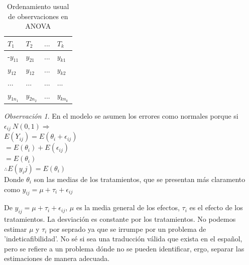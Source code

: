 \documentclass[11pt,a4paper,oneside]{report}
\theoremstyle{definition}
\theoremstyle{plain}
\theoremstyle{remark}
\newtheorem*{observacion}{Observación}
\begin{document}
\begin{table}[H]
  \centering
  \caption{Ordenamiento usual de observaciones en ANOVA}
  \begin{tabular}{@{}l >{\centering\arraybackslash}p{2.2cm}
                    >{\centering\arraybackslash}p{2.2cm}
                    >{\centering\arraybackslash}p{2.2cm}@{}}
    \toprule
    $T_1$ & $T_2$ & $...$ & $T_k$ \\
    \midrule
   -$y_{11}$ & $y_{21}$ &  $...$ & $y_{k1}$\\
    $y_{12}$ & $y_{12}$ &  $...$ & $y_{k2}$\\
    $...$ &  $...$ &  $...$ & $...$ \\
    $y_{1n_1}$ & $y_{2n_2}$ & $...$ & $y_{kn_k}$ \\
    \bottomrule
  \end{tabular}
\end{table}

\begin{observacion}
  En el modelo se asumen los errores como normales porque si $\epsilon_{ij}~N(0,1) \Rightarrow$\\
  $E(Y_{ij})=E(\theta_i + \epsilon_{ij})$\\
  $=E(\theta_i)+E(\epsilon_{ij})$\\
  $=E(\theta_i)$\\
  $\therefore E(y_ij)=E(\theta_i)$\\
  Donde $\theta_i$ son las medias de los tratamientos, que se presentan más claramento como $y_{ij}=\mu+\tau_i+\epsilon_{ij}$
\end{observacion}
  De $y_{ij}=\mu+\tau_i+\epsilon_{ij}$, $\mu$ es la media general de los efectos, $\tau_i$ es el efecto de los tratamientos. 
  La desviación es constante por los tratamientos. No podemos estimar $\mu$ y $\tau_i$ por seprado ya que se irrumpe por un problema de 
  'indeticafibilidad'. No sé si sea una traducción válida que exista en el español, pero se refiere a un problema dónde no se pueden 
  identificar, ergo, separar las estimaciones de manera adecuada. 
\end{document}
